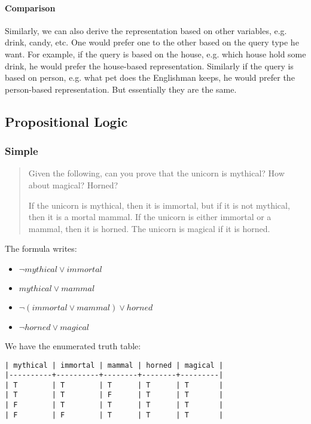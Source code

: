     
\paragraph{Comparison}
Similarly, we can also derive the representation based on other
variables, e.g. drink, candy, etc.  One would prefer one to the other
based on the query type he want.  For example, if the query is based
on the house, e.g. which house hold some drink, he would prefer the
house-based representation.  Similarly if the query is based on
person, e.g. what pet does the Englishman keeps, he would prefer the
person-based representation.  But essentially they are the same.



\subsection{Propositional Logic}
\subsubsection{Simple}
\begin{quote}
  Given the following, can you prove that the unicorn is mythical?
  How about magical? Horned?

  If the unicorn is mythical, then it is immortal,
  but if it is not mythical, then it is a mortal mammal.
  If the unicorn is either immortal or a mammal, then it is horned.
  The unicorn is magical if it is horned.
\end{quote}

The formula writes:
\begin{itemize}
\item $\neg mythical \vee immortal$
\item $mythical \vee mammal$
\item $\neg (immortal \vee mammal) \vee horned$
\item $\neg horned \vee magical$
\end{itemize}

We have the enumerated truth table:
\begin{lstlisting}
| mythical | immortal | mammal | horned | magical |
|----------+----------+--------+--------+---------|
| T        | T        | T      | T      | T       |
| T        | T        | F      | T      | T       |
| F        | T        | T      | T      | T       |
| F        | F        | T      | T      | T       |
\end{lstlisting}

